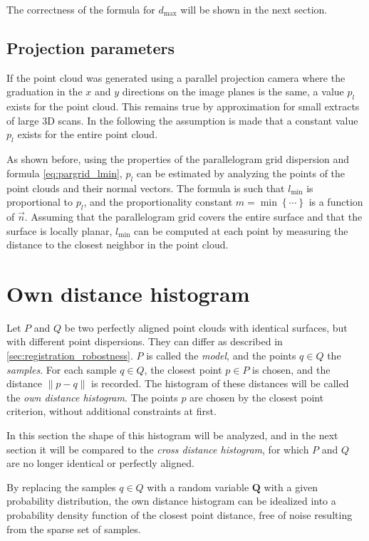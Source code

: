 The correctness of the formula for $d_{\text{max}}$ will be shown in the next section.


\subsection{Projection parameters}
If the point cloud was generated using a parallel projection camera where the graduation in the $x$ and $y$ directions on the image planes is the same, a value $p_l$ exists for the point cloud. This remains true by approximation for small extracts of large 3D scans. In the following the assumption is made that a constant value $p_l$ exists for the entire point cloud.

As shown before, using the properties of the parallelogram grid dispersion and formula \ref{eq:pargrid_lmin}, $p_l$ can be estimated by analyzing the points of the point clouds and their normal vectors. The formula is such that $l_{\text{min}}$ is proportional to $p_l$, and the proportionality constant $m = \min \left\{ \cdots \right\}$ is a function of $\vec{n}$. Assuming that the parallelogram grid covers the entire surface and that the surface is locally planar, $l_{\text{min}}$ can be computed at each point by measuring the distance to the closest neighbor in the point cloud.






\section{Own distance histogram}
Let $P$ and $Q$ be two perfectly aligned point clouds with identical surfaces, but with different point dispersions. They can differ as described in \ref{sec:registration_robostness}. $P$ is called the \emph{model}, and the points $q \in Q$ the \emph{samples}. For each sample $q \in Q$, the closest point $p \in P$ is chosen, and the distance $\|p - q\|$ is recorded. The histogram of these distances will be called the \emph{own distance histogram}. The points $p$ are chosen by the closest point criterion, without additional constraints at first.

In this section the shape of this histogram will be analyzed, and in the next section it will be compared to the \emph{cross distance histogram}, for which $P$ and $Q$ are no longer identical or perfectly aligned.

By replacing the samples $q \in Q$ with a random variable $\textbf{Q}$ with a given probability distribution, the own distance histogram can be idealized into a probability density function of the closest point distance, free of noise resulting from the sparse set of samples.

